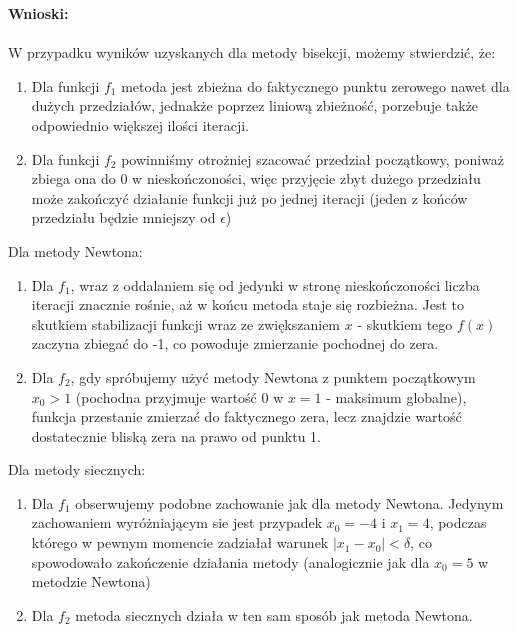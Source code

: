 \documentclass{article}
\begin{document}
\noindent \textbf{Wnioski: }\\\\
W przypadku wyników uzyskanych dla metody bisekcji, możemy stwierdzić, że:
\begin{enumerate}
	\item Dla funkcji $f_1$ metoda jest zbieżna do faktycznego punktu zerowego nawet dla dużych przedziałów, jednakże poprzez liniową zbieżność, porzebuje także odpowiednio większej ilości iteracji.
	\item Dla funkcji $f_2$ powinniśmy otrożniej szacować przedział początkowy, poniważ zbiega ona do 0 w nieskończoności, więc przyjęcie zbyt dużego przedziału może zakończyć działanie funkcji już po jednej iteracji (jeden z końców przedziału będzie mniejszy od $\epsilon$)
\end{enumerate}
Dla metody Newtona:
\begin{enumerate}
	\item Dla $f_1$, wraz z oddalaniem się od jedynki w stronę nieskończoności liczba iteracji znacznie rośnie, aż w końcu metoda staje się rozbieżna. Jest to skutkiem stabilizacji funkcji wraz ze zwiększaniem $x$ - skutkiem tego $f(x)$ zaczyna zbiegać do -1, co powoduje zmierzanie pochodnej do zera.
	\item Dla $f_2$, gdy spróbujemy użyć metody Newtona z punktem początkowym $x_0>1$ (pochodna przyjmuje wartość 0 w $x=1$ - maksimum globalne), funkcja przestanie zmierzać do faktycznego zera, lecz znajdzie wartość dostatecznie bliską zera na prawo od punktu 1.
\end{enumerate}
Dla metody siecznych:
\begin{enumerate}
	\item Dla $f_1$ obserwujemy podobne zachowanie jak dla metody Newtona. Jedynym zachowaniem wyróżniającym sie jest przypadek $x_0=-4$ i $x_1=4$, podczas którego w pewnym momencie zadziałał warunek $|x_1-x_0| < \delta$, co spowodowało zakończenie działania metody (analogicznie jak dla $x_0=5$ w metodzie Newtona)
	\item Dla $f_2$ metoda siecznych działa w ten sam sposób jak metoda Newtona.
\end{enumerate}
\end{document}
